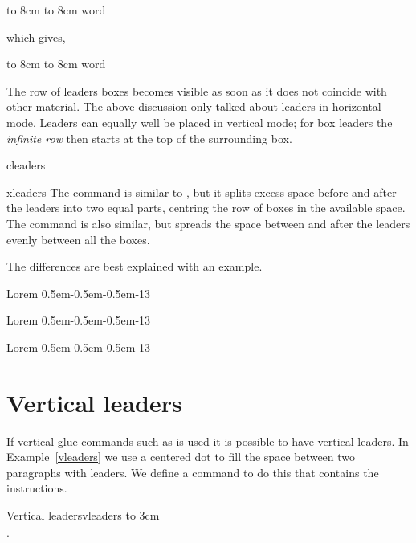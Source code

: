 \begin{texexample}{}{}
\hbox to 8cm {\leaders\copy\centerdot\hfil}
\hbox to 8cm {word\leaders\copy\centerdot\hfil}
\end{texexample}

which gives,

\hbox to 8cm {\leaders\copy\centerdot\hfil}
\hbox to 8cm {word\leaders\copy\centerdot\hfil}

The row of leaders boxes becomes visible as soon as it does not coincide with other material.
The above discussion only talked about leaders in horizontal mode. Leaders can equally well be
placed in vertical mode; for box leaders the \textit{infinite row} then starts at the top of the surrounding
box.


\begin{docCommand}{cleaders}{}
\begin{docCommand}{xleaders}{}
The  command is similar to 
, but it splits excess space before and after the leaders into two equal parts, centring the row of boxes in the available space.
The  command is also similar, but spreads the space between and after the leaders evenly between all the boxes.
\end{docCommand}
\end{docCommand}

The differences are best explained with an example.

\begin{texexample}{}{}
\def\leaderpattern{\hbox{\kern0.5em-\kern0.5em-\kern0.5em-}}
Lorem \leaders\leaderpattern\hfill 13\par
Lorem \cleaders\leaderpattern\hfill 13\par
Lorem \xleaders\leaderpattern\hfill 13\par
\end{texexample}




\section{Vertical leaders}

If vertical glue commands such as  is used it is possible to have
vertical leaders. In Example~\ref{vleaders} we use a centered dot  to fill the space between two paragraphs with leaders. We define a command
 to do this that contains the instructions.

\begin{texexample}{Vertical leaders}{vleaders}
\newcommand{\vdotfill}{%
  \par\leaders\hbox{$\cdot$}\vfill}
  \vbox to 3cm{
  \lorem
  \vdotfill
  \lorem
  }
\end{texexample}





